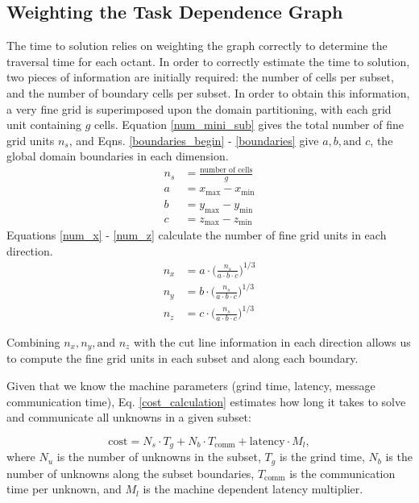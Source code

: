 \documentclass[11pt, letterpaper,titlepage,oneside]{article}
\begin{document}
\subsection{Weighting the Task Dependence Graph}\label{weighting_graphs}

The time to solution relies on weighting the graph correctly to determine the traversal time for each octant. In order to correctly estimate the time to solution, two pieces of information are initially required: the number of cells per subset, and the number of boundary cells per subset. In order to obtain this information, a very fine grid is superimposed upon the domain partitioning, with each grid unit containing $g$ cells. Equation \eqref{num_mini_sub} gives the total number of fine grid units $n_s$, and Eqns. \eqref{boundaries_begin} - \eqref{boundaries} give $a,b, \text{and }  c$, the global domain boundaries in each dimension. 
\begin{align}
\label{num_mini_sub}
n_s &= \frac{\text{number of cells}}{g} \\
\label{boundaries_begin}
a &= x_{\text{max}} - x_{\text{min}} \\
b &= y_{\text{max}} - y_{\text{min}} \\
c &= z_{\text{max}} - z_{\text{min}} 
\label{boundaries}
\end{align}
Equations \eqref{num_x} - \eqref{num_z} calculate the number of fine grid units in each direction.
\begin{align}
\label{num_x}
n_{x} &= a \cdot \Big(\frac{n_s}{a\cdot b \cdot c}\Big)^{1/3} \\
n_{y} &= b \cdot \Big(\frac{n_s}{a\cdot b \cdot c}\Big)^{1/3} \\
n_{z} &= c \cdot \Big(\frac{n_s}{a\cdot b \cdot c}\Big)^{1/3} 
\label{num_z}
\end{align}

Combining $n_x, n_y, \text{and } n_z$ with the cut line information in each direction allows us to compute the fine grid units in each subset and along each boundary.  

Given that we know the machine parameters (grind time, latency, message communication time), Eq. \ref{cost_calculation} estimates how long it takes to solve and communicate all unknowns in a given subset:

\begin{equation}
\text{cost} = N_s\cdot T_g + N_b\cdot T_{\text{comm}} + \text{latency}\cdot M_l,
\label{cost_calculation}
\end{equation}
where $N_u$ is the number of unknowns in the subset, $T_g$ is the grind time, $N_b$ is the number of unknowns along the subset boundaries, $T_\text{comm}$ is the communication time per unknown, and $M_l$ is the machine dependent latency multiplier. 
\end{document}
